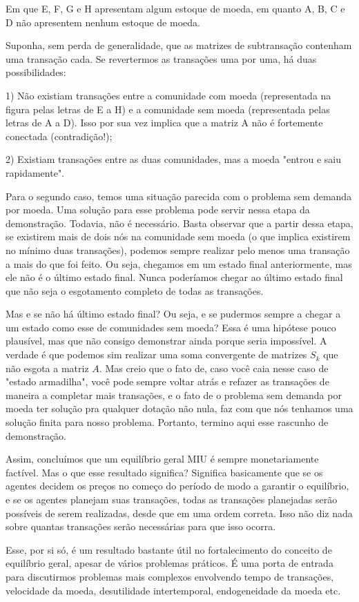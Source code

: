 \documentclass{article}
\begin{document}
\par Em que E, F, G e H apresentam algum estoque de moeda, em quanto A, B, C e D não apresentem nenhum estoque de moeda.
\par Suponha, sem perda de generalidade, que as matrizes de subtransação contenham uma transação cada. Se revertermos as transações uma por uma, há duas possibilidades:
\par 1) Não existiam transações entre a comunidade com moeda (representada na figura pelas letras de E a H) e a comunidade sem moeda (representada pelas letras de A a D). Isso por sua vez implica que a matriz A não é fortemente conectada (contradição!);
\par 2) Existiam transações entre as duas comunidades, mas a moeda "entrou e saiu rapidamente".
\par Para o segundo caso, temos uma situação parecida com o problema sem demanda por moeda. Uma solução para esse problema pode servir nessa etapa da demonstração. Todavia, não é necessário. Basta observar que a partir dessa etapa, se existirem mais de dois nós na comunidade sem moeda (o que implica existirem no mínimo duas transações), podemos sempre realizar pelo menos uma transação a mais do que foi feito. Ou seja, chegamos em um estado final anteriormente, mas ele não é o último estado final. Nunca poderíamos chegar ao último estado final que não seja o esgotamento completo de todas as transações.
\par Mas e se não há último estado final? Ou seja, e se pudermos sempre a chegar a um estado como esse de comunidades sem moeda? Essa é uma hipótese pouco plausível, mas que não consigo demonstrar ainda porque seria impossível. A verdade é que podemos sim realizar uma soma convergente de matrizes $S_k$ que não esgota a matriz $A$. Mas creio que o fato de, caso você caia nesse caso de "estado armadilha", você pode sempre voltar atrás e refazer as transações de maneira a completar mais transações, e o fato de o problema sem demanda por moeda ter solução pra qualquer dotação não nula, faz com que nós tenhamos uma solução finita para nosso problema. Portanto, termino aqui esse rascunho de demonstração.
\par Assim, concluímos que um equilíbrio geral MIU é sempre monetariamente factível. Mas o que esse resultado significa? Significa basicamente que se os agentes decidem os preços no começo do período de modo a garantir o equilíbrio, e se os agentes planejam suas transações, todas as transações planejadas serão possíveis de serem realizadas, desde que em uma ordem correta. Isso não diz nada sobre quantas transações serão necessárias para que isso ocorra.
\par Esse, por si só, é um resultado bastante útil no fortalecimento do conceito de equilíbrio geral, apesar de vários problemas práticos. É uma porta de entrada para discutirmos problemas mais complexos envolvendo tempo de transações, velocidade da moeda, desutilidade intertemporal, endogeneidade da moeda etc.
\end{document}
